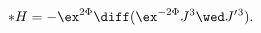 \begin{equation}
\label{su2su2flux}
   *H = -\ex^{2\Phi} \diff (\ex^{-2\Phi} J^3 \wed J'{}^3) .
\end{equation}

